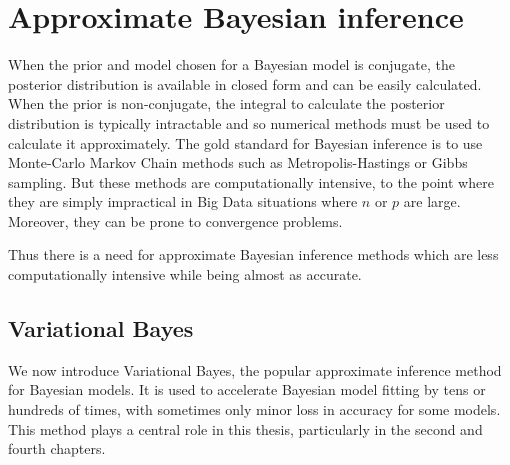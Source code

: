 

\section{Approximate Bayesian inference}
When the prior and model chosen for a Bayesian model is conjugate, the posterior distribution is available in
closed form and can be easily calculated.
When the prior is non-conjugate, the integral to calculate the posterior distribution is typically intractable
and so numerical methods must be used to calculate it approximately.
The gold standard for Bayesian inference is to use Monte-Carlo Markov Chain methods such as Metropolis-Hastings
or Gibbs sampling. But these methods are computationally intensive, to the point where they are simply
impractical in Big Data situations where $n$ or $p$ are large. Moreover, they can be prone to convergence 
problems.

Thus there is a need for approximate Bayesian inference methods which are less computationally intensive while
being almost as accurate.

 
\subsection{Variational Bayes}
\label{sec:vb}
We now introduce Variational Bayes, the popular approximate inference method for Bayesian models. It is used
to accelerate Bayesian model fitting by tens or hundreds of times, with sometimes only minor loss in accuracy for some
models. This method plays a central role in this thesis, particularly in the second and fourth chapters.


